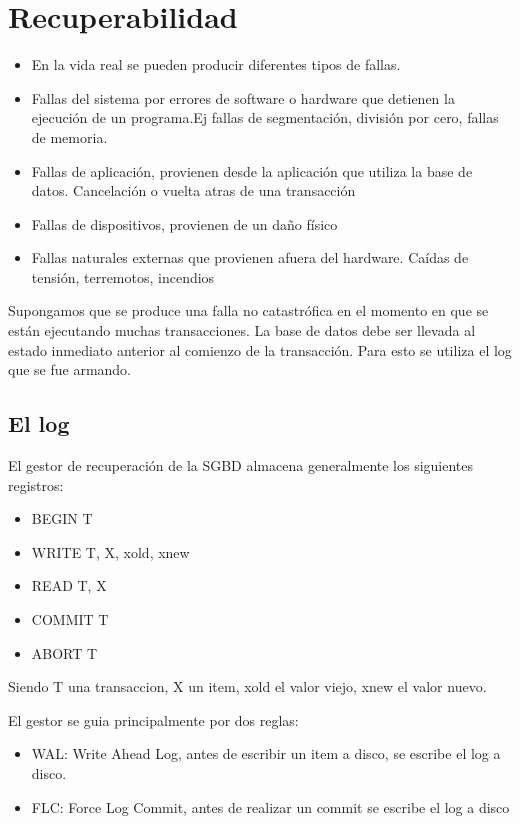 \section{Recuperabilidad}

\begin{itemize}
\item En la vida real se pueden producir diferentes tipos de fallas.
\item Fallas del sistema por errores de software o hardware que detienen la ejecución de un programa.Ej fallas de segmentación, división por cero, fallas de memoria.
\item Fallas de aplicación, provienen desde la aplicación que utiliza la base de datos. Cancelación o vuelta atras de una transacción
\item Fallas de dispositivos, provienen de un daño físico
\item Fallas naturales externas que provienen afuera del hardware. Caídas de tensión, terremotos, incendios
\end{itemize}

Supongamos que se produce una falla no catastrófica en el momento en que se están ejecutando muchas transacciones. La base de datos debe ser llevada al estado inmediato anterior al comienzo de la transacción. Para esto se utiliza el log que se fue armando.

\subsection*{El log}
El gestor de recuperación de la SGBD almacena generalmente los siguientes registros:

\begin{itemize}
\item BEGIN T
\item WRITE T, X, xold, xnew
\item READ T, X
\item COMMIT T
\item ABORT T
\end{itemize}

Siendo T una transaccion, X un item, xold el valor viejo, xnew el valor nuevo.

\medskip
El gestor se guia principalmente por dos reglas:

\begin{itemize}
\item WAL: Write Ahead Log, antes de escribir un item a disco, se escribe el log a disco.
\item FLC: Force Log Commit, antes de realizar un commit se escribe el log a disco
\end{itemize}

